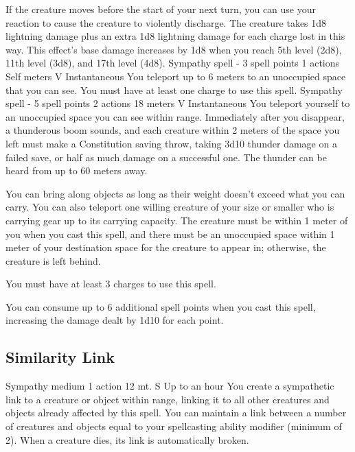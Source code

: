        If the creature moves before the start of your next turn, you can use your reaction to cause the creature to violently discharge.
        The creature takes 1d8 lightning damage plus an extra 1d8 lightning damage for each charge lost in this way.
        This effect's base damage increases by 1d8 when you reach 5th level (2d8), 11th level (3d8), and 17th level (4d8).
        {Sympathy spell - 3 spell points}
        {1 actions}
        {Self meters}
        {V}
        {Instantaneous}
        You teleport up to 6 meters to an unoccupied space that you can see.
        You must have at least one charge to use this spell.
        {Sympathy spell - 5 spell points}
        {2 actions}
        {18 meters}
        {V}
        {Instantaneous}
        You teleport yourself to an unoccupied space you can see within range.
        Immediately after you disappear, a thunderous boom sounds, and each creature within 2 meters of the space you left must make a Constitution saving throw, taking 3d10 thunder damage on a failed save, or half as much damage on a successful one.
        The thunder can be heard from up to 60 meters away.

        You can bring along objects as long as their weight doesn't exceed what you can carry.
        You can also teleport one willing creature of your size or smaller who is carrying gear up to its carrying capacity.
        The creature must be within 1 meter of you when you cast this spell, and there must be an unoccupied space within 1 meter of your destination space for the creature to appear in; otherwise, the creature is left behind.

        You must have at least 3 charges to use this spell.

        You can consume up to 6 additional spell points when you cast this spell, increasing the damage dealt by 1d10 for each point.

\subsection*{Similarity Link}
        {Sympathy medium}
        {1 action}
        {12 mt.}
        {S}
        {Up to an hour}
        You create a sympathetic link to a creature or object within range, linking it to all other creatures and objects already affected by this spell.
        You can maintain a link between a number of creatures and objects equal to your spellcasting ability modifier (minimum of 2).
        When a creature dies, its link is automatically broken.

